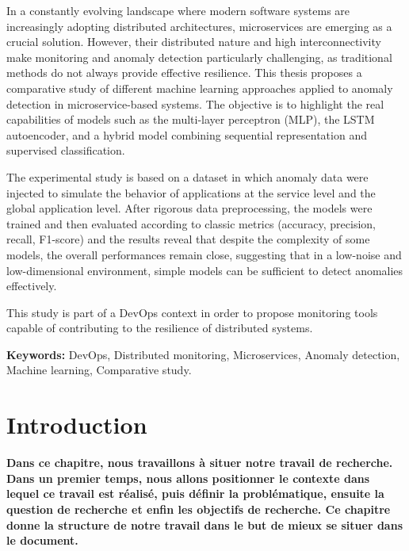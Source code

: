 \documentclass[a4paper,12pt]{report}
\begin{document}
In a constantly evolving landscape where modern software systems are increasingly adopting distributed architectures, microservices are emerging as a crucial solution. However, their distributed nature and high interconnectivity make monitoring and anomaly detection particularly challenging, as traditional methods do not always provide effective resilience. This thesis proposes a comparative study of different machine learning approaches applied to anomaly detection in microservice-based systems.
The objective is to highlight the real capabilities of models such as the multi-layer perceptron (MLP), the LSTM autoencoder, and a hybrid model combining sequential representation and supervised classification.

The experimental study is based on a dataset in which anomaly data were injected to simulate the behavior of applications at the service level and the global application level. After rigorous data preprocessing, the models were trained and then evaluated according to classic metrics (accuracy, precision, recall, F1-score) and the results reveal that despite the complexity of some models, the overall performances remain close, suggesting that in a low-noise and low-dimensional environment, simple models can be sufficient to detect anomalies effectively.

This study is part of a DevOps context in order to propose monitoring tools capable of contributing to the resilience of distributed systems.


\vspace{0.5cm}
\noindent\textbf{Keywords:} DevOps, Distributed monitoring, Microservices, Anomaly detection, Machine learning, Comparative study.


\tableofcontents
\listoffigures
\listoftables
\newpage

\cleardoublepage
{}
\chapter{Introduction}
\textbf{Dans ce chapitre, nous travaillons à situer notre travail de recherche. Dans un premier temps, nous allons positionner le contexte dans lequel ce travail est réalisé, puis définir la problématique, ensuite la question de recherche et enfin les objectifs de recherche. Ce chapitre donne la structure de notre travail dans le but de mieux se situer dans le document.} 
\end{document}
